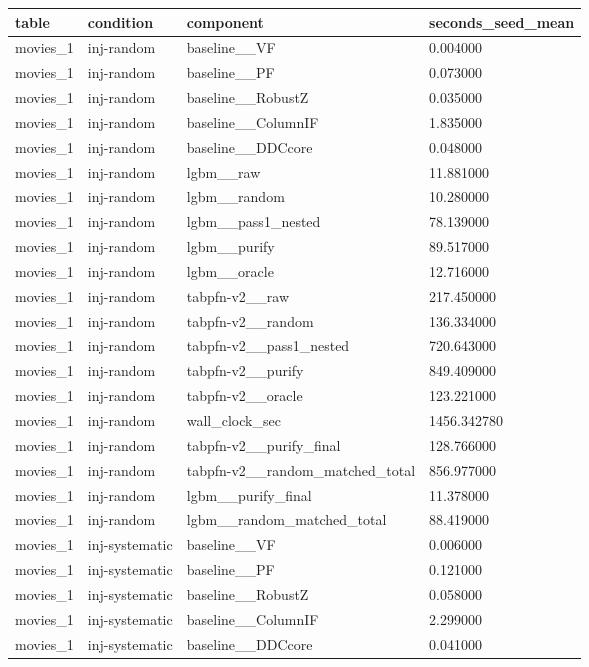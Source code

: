 \begin{tabular}{llll}
\hline
table & condition & component & seconds\_seed\_mean \\
\hline
movies\_1 & inj-random & baseline\_\_VF & 0.004000 \\
movies\_1 & inj-random & baseline\_\_PF & 0.073000 \\
movies\_1 & inj-random & baseline\_\_RobustZ & 0.035000 \\
movies\_1 & inj-random & baseline\_\_ColumnIF & 1.835000 \\
movies\_1 & inj-random & baseline\_\_DDCcore & 0.048000 \\
movies\_1 & inj-random & lgbm\_\_raw & 11.881000 \\
movies\_1 & inj-random & lgbm\_\_random & 10.280000 \\
movies\_1 & inj-random & lgbm\_\_pass1\_nested & 78.139000 \\
movies\_1 & inj-random & lgbm\_\_purify & 89.517000 \\
movies\_1 & inj-random & lgbm\_\_oracle & 12.716000 \\
movies\_1 & inj-random & tabpfn-v2\_\_raw & 217.450000 \\
movies\_1 & inj-random & tabpfn-v2\_\_random & 136.334000 \\
movies\_1 & inj-random & tabpfn-v2\_\_pass1\_nested & 720.643000 \\
movies\_1 & inj-random & tabpfn-v2\_\_purify & 849.409000 \\
movies\_1 & inj-random & tabpfn-v2\_\_oracle & 123.221000 \\
movies\_1 & inj-random & wall\_clock\_sec & 1456.342780 \\
movies\_1 & inj-random & tabpfn-v2\_\_purify\_final & 128.766000 \\
movies\_1 & inj-random & tabpfn-v2\_\_random\_matched\_total & 856.977000 \\
movies\_1 & inj-random & lgbm\_\_purify\_final & 11.378000 \\
movies\_1 & inj-random & lgbm\_\_random\_matched\_total & 88.419000 \\
movies\_1 & inj-systematic & baseline\_\_VF & 0.006000 \\
movies\_1 & inj-systematic & baseline\_\_PF & 0.121000 \\
movies\_1 & inj-systematic & baseline\_\_RobustZ & 0.058000 \\
movies\_1 & inj-systematic & baseline\_\_ColumnIF & 2.299000 \\
movies\_1 & inj-systematic & baseline\_\_DDCcore & 0.041000 \\

\end{tabular}
